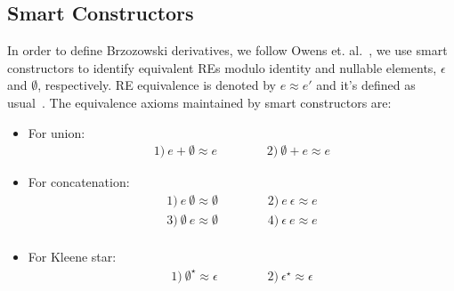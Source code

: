 \documentclass[review]{elsarticle}
\begin{document}
\subsection{Smart Constructors}\label{sec:smart}

In order to define Brzozowski derivatives, we follow Owens et. al.~\cite{Owens2009}, we use
smart constructors to identify equivalent REs modulo identity and nullable
elements, $\epsilon$ and $\emptyset$, respectively. RE equivalence is
denoted by $e \approx e'$ and it's defined as usual~\cite{Hopcroft2000}.
The equivalence axioms maintained by smart constructors are:
\begin{itemize}
    \item For union:
      \[
          \begin{array}{ccc}
              1)\: e + \emptyset \approx e &\hspace{1cm} & 2)\: \emptyset + e \approx e
          \end{array}
      \]
      \item For concatenation:
      \[
          \begin{array}{ccc}
              1)\: e\:\emptyset \approx \emptyset & \hspace{1cm} & 2)\: e\:\epsilon \approx e\\
              3)\: \emptyset\:e\approx \emptyset & & 4)\: \epsilon\: e \approx e\\
          \end{array}
      \]
      \item For Kleene star:
      \[
           \begin{array}{ccc}
               1)\: \emptyset^\star \approx \epsilon & \hspace{1cm} & 2)\: \epsilon^\star
                                                  \approx \epsilon
           \end{array}
      \]
\end{itemize}
\end{document}
